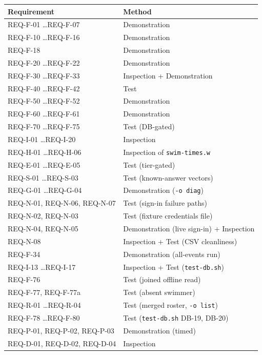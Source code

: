 \documentclass[12pt]{article}
\begin{document}
\begin{center}
\begin{longtable}{ll}
  \toprule
  \textbf{Requirement} & \textbf{Method} \\
  \midrule\endhead
  REQ-F-01 \ldots REQ-F-07 & Demonstration \\
  REQ-F-10 \ldots REQ-F-16 & Demonstration \\
  REQ-F-18                 & Demonstration \\
  REQ-F-20 \ldots REQ-F-22 & Demonstration \\
  REQ-F-30 \ldots REQ-F-33 & Inspection + Demonstration \\
  REQ-F-40 \ldots REQ-F-42 & Test \\
  REQ-F-50 \ldots REQ-F-52 & Demonstration \\
  REQ-F-60 \ldots REQ-F-61 & Demonstration \\
  REQ-F-70 \ldots REQ-F-75 & Test (DB-gated) \\
  REQ-I-01 \ldots REQ-I-20 & Inspection \\
  REQ-H-01 \ldots REQ-H-06 & Inspection of \texttt{swim-times.w} \\
  REQ-E-01 \ldots REQ-E-05 & Test (tier-gated) \\
  REQ-S-01 \ldots REQ-S-03 & Test (known-answer vectors) \\
  REQ-G-01 \ldots REQ-G-04 & Demonstration (\texttt{-o diag}) \\
  REQ-N-01, REQ-N-06, REQ-N-07 & Test (sign-in failure paths) \\
  REQ-N-02, REQ-N-03 & Test (fixture credentials file) \\
  REQ-N-04, REQ-N-05 & Demonstration (live sign-in) + Inspection \\
  REQ-N-08 & Inspection + Test (CSV cleanliness) \\
  REQ-F-34 & Demonstration (all-events run) \\
  REQ-I-13 \ldots REQ-I-17 & Inspection + Test (\texttt{test-db.sh}) \\
  REQ-F-76 & Test (joined offline read) \\
  REQ-F-77, REQ-F-77a & Test (absent swimmer) \\
  REQ-R-01 \ldots REQ-R-04 & Test (merged roster, \texttt{-o list}) \\
  REQ-F-78 \ldots REQ-F-80 & Test (\texttt{test-db.sh} DB-19, DB-20) \\
  REQ-P-01, REQ-P-02, REQ-P-03 & Demonstration (timed) \\
  REQ-D-01, REQ-D-02, REQ-D-04 & Inspection \\

\end{longtable}
\end{center}
\end{document}
